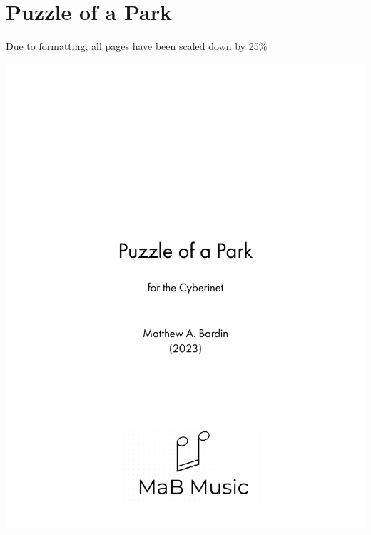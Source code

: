 \section{Puzzle of a Park}
Due to formatting, all pages have been scaled down by 25\%
\begin{center}
    \includegraphics[scale=0.7]{Scores/puzzlePart1.pdf}
    \end{center}
    \newpage
